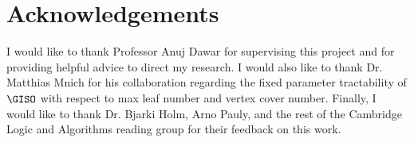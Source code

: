 \documentclass[11pt]{report}
\begin{document}
\section{Acknowledgements}

I would like to thank Professor Anuj Dawar for supervising this project and for providing helpful advice to direct my research. I would also like to thank Dr. Matthias Mnich for his collaboration regarding the fixed parameter tractability of $\GISO$ with respect to max leaf number and vertex cover number. Finally, I would like to thank Dr. Bjarki Holm, Arno Pauly, and the rest of the Cambridge Logic and Algorithms reading group for their feedback on this work.





	



\newpage
\appendix


\end{document}
